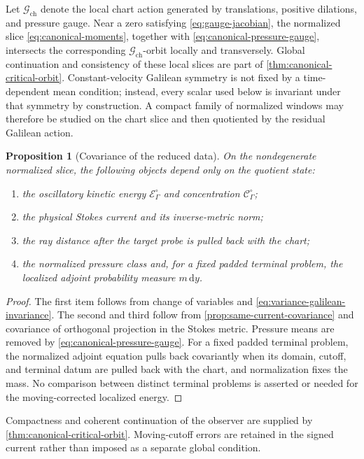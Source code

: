 \documentclass[11pt]{amsart}
\numberwithin{equation}{section}
\theoremstyle{plain}
\newtheorem{proposition}[proposition]{Proposition}
\theoremstyle{definition}
\theoremstyle{remark}
\newcommand{\dd}{\,\mathrm d}
\newcommand{\OscEnergy}{\mathcal E^{\circ}}
\newcommand{\OscMass}{\mathcal C^{\circ}}
\begin{document}
Let \(\mathcal G_{\mathrm{ch}}\) denote the local chart action generated by
translations, positive dilations, and pressure gauge.  Near a zero satisfying
\eqref{eq:gauge-jacobian}, the normalized slice
\eqref{eq:canonical-moments}, together with
\eqref{eq:canonical-pressure-gauge}, intersects the corresponding
\(\mathcal G_{\mathrm{ch}}\)-orbit locally and transversely.  Global
continuation and consistency of these local slices are part of
\cref{thm:canonical-critical-orbit}.  Constant-velocity Galilean symmetry
is not fixed by a time-dependent mean condition; instead, every scalar used
below is invariant under that symmetry by construction.  A compact family of
normalized windows may therefore be studied on the chart slice and then
quotiented by the residual Galilean action.

\begin{proposition}[Covariance of the reduced data]
\label{prop:reduced-data-covariance}
On the nondegenerate normalized slice, the following objects depend only on
the quotient state:
\begin{enumerate}[label=\textup{(\roman*)},leftmargin=2.2em]
\item the oscillatory kinetic energy \(\OscEnergy_\Gamma\) and concentration
\(\OscMass_\Gamma\);
\item the physical Stokes current and its inverse-metric norm;
\item the ray distance after the target probe is pulled back with the chart;
\item the normalized pressure class and, for a fixed padded terminal problem,
the localized adjoint probability measure \(m\dd y\).
\end{enumerate}
\end{proposition}

\begin{proof}
The first item follows from change of variables and
\eqref{eq:variance-galilean-invariance}.  The second and third follow from
\cref{prop:same-current-covariance} and covariance of orthogonal projection in
the Stokes metric.  Pressure means are removed by
\eqref{eq:canonical-pressure-gauge}.  For a fixed padded terminal problem, the
normalized adjoint equation pulls back covariantly when its domain, cutoff,
and terminal datum are pulled back with the chart, and normalization fixes the
mass.  No comparison between distinct terminal problems is asserted or needed
for the moving-corrected localized energy.
\end{proof}

Compactness and coherent continuation of the observer are supplied by
\cref{thm:canonical-critical-orbit}.  Moving-cutoff errors are retained in
the signed current rather than imposed as a separate global condition.
\end{document}
